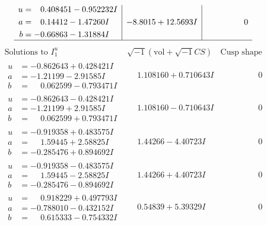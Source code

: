\documentclass[1p]{elsarticle_modified}
\theoremstyle{definition}
\newcommand{\I}{\sqrt{-1}}
\begin{document}
$$\begin{array}{c|c|c}
\begin{aligned}
u &= \phantom{-}0.408451 - 0.952232 I \\
a &= \phantom{-}0.14412 - 1.47260 I \\
b &= -0.66863 - 1.31884 I\end{aligned}
 & -8.8015 + 12.5693 I & \phantom{-0.000000 } 0\\
 \hline 
 \end{array}$$\newpage$$\begin{array}{c|c|c}  
\text{Solutions to }I^u_{1}& \I (\text{vol} + \sqrt{-1}CS) & \text{Cusp shape}\\
 \hline 
\begin{aligned}
u &= -0.862643 + 0.428421 I \\
a &= -1.21199 - 2.91585 I \\
b &= \phantom{-}0.062599 - 0.793471 I\end{aligned}
 & \phantom{-}1.108160 + 0.710643 I & \phantom{-0.000000 } 0 \\ \hline\begin{aligned}
u &= -0.862643 - 0.428421 I \\
a &= -1.21199 + 2.91585 I \\
b &= \phantom{-}0.062599 + 0.793471 I\end{aligned}
 & \phantom{-}1.108160 - 0.710643 I & \phantom{-0.000000 } 0 \\ \hline\begin{aligned}
u &= -0.919358 + 0.483575 I \\
a &= \phantom{-}1.59445 + 2.58825 I \\
b &= -0.285476 + 0.894692 I\end{aligned}
 & \phantom{-}1.44266 - 4.40723 I & \phantom{-0.000000 } 0 \\ \hline\begin{aligned}
u &= -0.919358 - 0.483575 I \\
a &= \phantom{-}1.59445 - 2.58825 I \\
b &= -0.285476 - 0.894692 I\end{aligned}
 & \phantom{-}1.44266 + 4.40723 I & \phantom{-0.000000 } 0 \\ \hline\begin{aligned}
u &= \phantom{-}0.918229 + 0.497793 I \\
a &= -0.788010 - 0.432152 I \\
b &= \phantom{-}0.615333 - 0.754332 I\end{aligned}
 & \phantom{-}0.54839 + 5.39329 I & \phantom{-0.000000 } 0 \\ \hline\begin{aligned}

\end{aligned}
\end{array}$$
\end{document}
